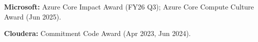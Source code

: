 \noindent\textbf{Microsoft:} Azure Core Impact Award (FY26 Q3); Azure Core Compute Culture Award (Jun 2025).\par
\noindent\textbf{Cloudera:} Commitment Code Award (Apr 2023, Jun 2024).\par
